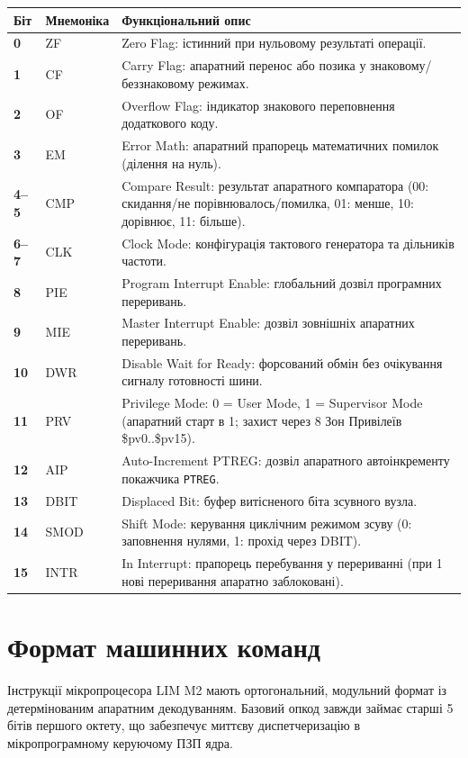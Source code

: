\documentclass[11pt,a4paper]{article}
\newcommand{\reg}[1]{\texttt{#1}}
\begin{document}
\begin{tabularx}{\textwidth}{>{\bfseries}p{14mm}>{\ttfamily}p{23mm}X}
\toprule
Біт & Мнемоніка & Функціональний опис \\
\midrule
0    & ZF   & Zero Flag: істинний при нульовому результаті операції. \\
1    & CF   & Carry Flag: апаратний перенос або позика у знаковому/беззнаковому режимах. \\
2    & OF   & Overflow Flag: індикатор знакового переповнення додаткового коду. \\
3    & EM   & Error Math: апаратний прапорець математичних помилок (ділення на нуль). \\
4--5 & CMP  & Compare Result: результат апаратного компаратора (00: скидання/не порівнювалось/помилка, 01: менше, 10: дорівнює, 11: більше). \\
6--7 & CLK  & Clock Mode: конфігурація тактового генератора та дільників частоти. \\
8    & PIE  & Program Interrupt Enable: глобальний дозвіл програмних переривань. \\
9    & MIE  & Master Interrupt Enable: дозвіл зовнішніх апаратних переривань. \\
10   & DWR  & Disable Wait for Ready: форсований обмін без очікування сигналу готовності шини. \\
11   & PRV  & Privilege Mode: 0 = User Mode, 1 = Supervisor Mode (апаратний старт в 1; захист через 8 Зон Привілеїв \$pv0..\$pv15). \\
12   & AIP  & Auto-Increment PTREG: дозвіл апаратного автоінкременту покажчика \reg{PTREG}. \\
13   & DBIT & Displaced Bit: буфер витісненого біта зсувного вузла. \\
14   & SMOD & Shift Mode: керування циклічним режимом зсуву (0: заповнення нулями, 1: прохід через DBIT). \\
15   & INTR & In Interrupt: прапорець перебування у перериванні (при 1 нові переривання апаратно заблоковані). \\
\bottomrule
\end{tabularx}

\section{Формат машинних команд}
Інструкції мікропроцесора LIM M2 мають ортогональний, модульний формат із детермінованим апаратним декодуванням. 
Базовий опкод завжди займає старші 5 бітів першого октету, що забезпечує миттєву диспетчеризацію в мікропрограмному керуючому ПЗП ядра.
\end{document}
